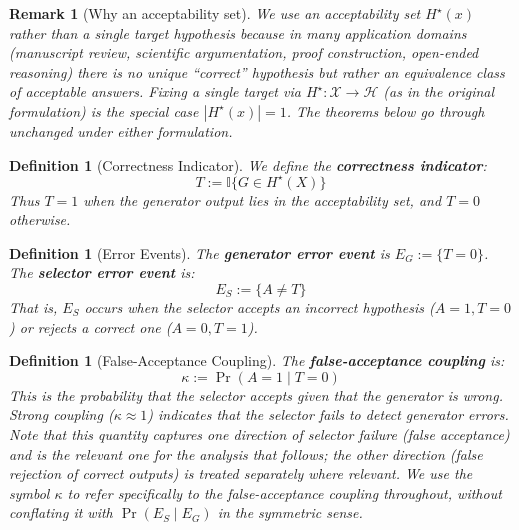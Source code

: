 \documentclass[11pt]{article}
\newtheorem{definition}[theorem]{Definition}
\newtheorem{remark}[theorem]{Remark}
\begin{document}
\begin{remark}[Why an acceptability set]
We use an acceptability set $H^\star(x)$ rather than a single target hypothesis because in many application domains (manuscript review, scientific argumentation, proof construction, open-ended reasoning) there is no unique ``correct'' hypothesis but rather an equivalence class of acceptable answers. Fixing a single target via $H^\star: \mathcal{X} \to \mathcal{H}$ (as in the original formulation) is the special case $|H^\star(x)| = 1$. The theorems below go through unchanged under either formulation.
\end{remark}

\begin{definition}[Correctness Indicator]
We define the \textbf{correctness indicator}:
\begin{equation}
T := \mathbb{I}\{G \in H^\star(X)\}
\end{equation}
Thus $T = 1$ when the generator output lies in the acceptability set, and $T = 0$ otherwise.
\end{definition}

\begin{definition}[Error Events]
The \textbf{generator error event} is $E_G := \{T = 0\}$. The \textbf{selector error event} is:
\begin{equation}
E_S := \{A \neq T\}
\end{equation}
That is, $E_S$ occurs when the selector accepts an incorrect hypothesis ($A=1, T=0$) or rejects a correct one ($A=0, T=1$).
\end{definition}

\begin{definition}[False-Acceptance Coupling]
The \textbf{false-acceptance coupling} is:
\begin{equation}
\kappa := \Pr(A = 1 \mid T = 0)
\end{equation}
This is the probability that the selector accepts given that the generator is wrong. Strong coupling ($\kappa \approx 1$) indicates that the selector fails to detect generator errors. Note that this quantity captures one direction of selector failure (false acceptance) and is the relevant one for the analysis that follows; the other direction (false rejection of correct outputs) is treated separately where relevant. We use the symbol $\kappa$ to refer specifically to the false-acceptance coupling throughout, without conflating it with $\Pr(E_S \mid E_G)$ in the symmetric sense.
\end{definition}
\end{document}
